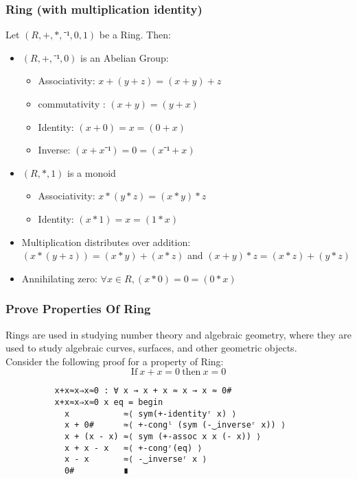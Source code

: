 \documentclass[xcolor={dvipsnames}]{beamer}
\begin{document}

  \begin{frame}[fragile]
    \frametitle{Ring (with multiplication identity)}  

    Let $(R,+,*,⁻¹,0,1)$ be a Ring. Then:
        \begin{itemize}
            \item $(R,+,⁻¹,0)$ is an Abelian Group:
             \begin{itemize}
              \item Associativity: $ x + (y + z) = (x + y) + z$
              \item commutativity : $ (x + y) = (y + x)$
              \item Identity: $ (x + 0) = x = (0 + x)$
              \item Inverse: $ (x + x⁻¹) = 0 = (x⁻¹ + x)$
            \end{itemize}
            \item $(R,*,1)$ is a monoid
            \begin{itemize}
              \item Associativity: $ x * (y * z) = (x * y) * z$
              \item Identity: $ (x * 1) = x = (1 * x)$
            \end{itemize}
            \item Multiplication distributes over addition: \( (x * (y + z)) = (x * y) + (x
            * z)\) and \( (x + y) * z = (x * z) + (y * z) \)
            \item Annihilating zero: \(\forall x \in R, (x * 0) = 0 = (0 * x)\)
          \end{itemize}
  \end{frame}


  \begin{frame}[fragile]
    \frametitle{Prove Properties Of Ring}
    Rings are used in studying number theory and algebraic geometry, where they
    are used to study algebraic curves, surfaces, and other geometric objects.\\

    Consider the following proof for a property of Ring:
        \[\text{If}\ x + x =0 \ \text{then}\ x=0\]

        \begin{verbatim}
          x+x≈x⇒x≈0 : ∀ x → x + x ≈ x → x ≈ 0#
          x+x≈x⇒x≈0 x eq = begin
            x           ≈⟨ sym(+-identityʳ x) ⟩
            x + 0#      ≈⟨ +-congˡ (sym (-‿inverseʳ x)) ⟩
            x + (x - x) ≈⟨ sym (+-assoc x x (- x)) ⟩
            x + x - x   ≈⟨ +-congʳ(eq) ⟩
            x - x       ≈⟨ -‿inverseʳ x ⟩
            0#          ∎
          \end{verbatim}

  \end{frame} 
\end{document}
